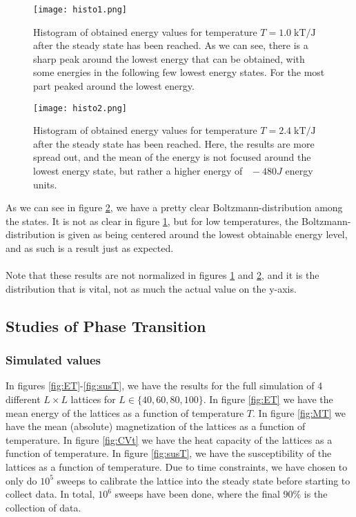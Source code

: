 \documentclass[reprint,english,notitlepage]{revtex4-1}  %
\begin{document}
\begin{figure}[h!]
    \centering
    \texttt{[image: histo1.png]}
    \caption{Histogram of obtained energy values for temperature $T = 1.0\;\text{kT/J}$ after the steady state has been reached. As we can see, there is a sharp peak around the lowest energy that can be obtained, with some energies in the following few lowest energy states. For the most part peaked around the lowest energy.}
    \label{fig:histo1}
\end{figure}

\begin{figure}[h!]
    \centering
    \texttt{[image: histo2.png]}
    \caption{Histogram of obtained energy values for temperature $T = 2.4\;\text{kT/J}$ after the steady state has been reached. Here, the results are more spread out, and the mean of the energy is not focused around the lowest energy state, but rather a higher energy of $~\;-480J$ energy units.}
    \label{fig:histo2}
\end{figure}

As we can see in figure \ref{fig:histo2}, we have a pretty clear Boltzmann-distribution among the states. It is not as clear in figure \ref{fig:histo1}, but for low temperatures, the Boltzmann-distribution is given as being centered around the lowest obtainable energy level, and as such is a result just as expected.
\\
\\
Note that these results are not normalized in figures \ref{fig:histo1} and \ref{fig:histo2}, and it is the distribution that is vital, not as much the actual value on the y-axis.

\subsection{Studies of Phase Transition}

\subsubsection{Simulated values}

In figures \ref{fig:ET}-\ref{fig:susT}, we have the results for the full simulation of 4 different $L \times L$ lattices for $L \in \{40,60,80,100\}$. In figure \ref{fig:ET} we have the mean energy of the lattices as a function of temperature $T$. In figure \ref{fig:MT} we have the mean (absolute) magnetization of the lattices as a function of temperature. In figure \ref{fig:CVt} we have the heat capacity of the lattices as a function of temperature. In figure \ref{fig:susT}, we have the susceptibility of the lattices as a function of temperature. Due to time constraints, we have chosen to only do $10^5$ sweeps to calibrate the lattice into the steady state before starting to collect data. In total, $10^6$ sweeps have been done, where the final $90\%$ is the collection of data.
\end{document}
